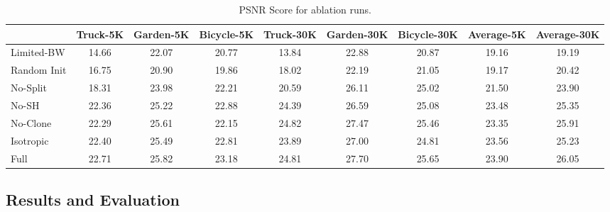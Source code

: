 \begin{table}[!h]
	\caption{PSNR Score for ablation runs. }
	\centering
	\begin{tabular}{l|ccc|ccc|cc}
		~ & Truck-5K & Garden-5K & Bicycle-5K & Truck-30K & Garden-30K & Bicycle-30K & Average-5K & Average-30K \\ \hline
		Limited-BW  & 14.66 & 22.07 & 20.77 & 13.84 & 22.88 & 20.87 & 19.16 & 19.19 \\
		Random Init & 16.75 & 20.90 & 19.86 & 18.02 & 22.19 & 21.05 & 19.17 & 20.42 \\
		No-Split    & 18.31 & 23.98 & 22.21 & 20.59 & 26.11 & 25.02 & 21.50 & 23.90 \\
		No-SH       & \cellcolor{yellow!40}22.36 & 25.22 & \cellcolor{orange!40}22.88 & \cellcolor{yellow!40}24.39 & 26.59 & \cellcolor{yellow!40}25.08 & \cellcolor{yellow!40}23.48 & \cellcolor{yellow!40}25.35 \\
		No-Clone    & 22.29 & \cellcolor{orange!40}25.61 & 22.15 & \cellcolor{red!40}24.82 & \cellcolor{orange!40}27.47 & \cellcolor{orange!40}25.46 & 23.35 & \cellcolor{orange!40}25.91 \\
		Isotropic   & \cellcolor{orange!40}22.40 & \cellcolor{yellow!40}25.49 & \cellcolor{yellow!40}22.81 & 23.89 & \cellcolor{yellow!40}27.00 & 24.81 & \cellcolor{orange!40}23.56 & 25.23 \\
		Full        & \cellcolor{red!40}22.71 & \cellcolor{red!40}25.82 & \cellcolor{red!40}23.18 & \cellcolor{orange!40}24.81 &\cellcolor{red!40} 27.70 & \cellcolor{red!40}25.65 & \cellcolor{red!40}23.90 & \cellcolor{red!40}26.05 \\

	\end{tabular}
	\label{tab:ablation_table}
\end{table}




\subsection{Results and Evaluation}


